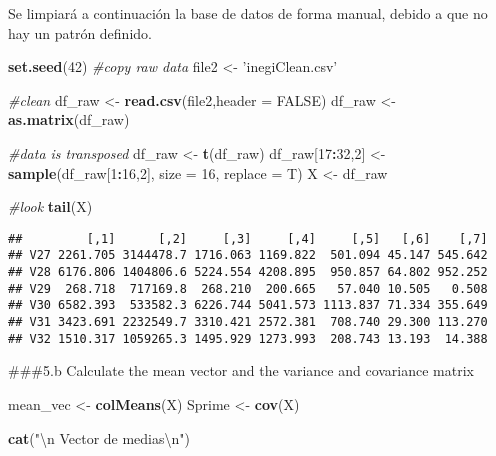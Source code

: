 \documentclass[]{article}
\newenvironment{Shaded}{\begin{snugshade}}{\end{snugshade}}
\newcommand{\CharTok}[1]{\textcolor[rgb]{0.31,0.60,0.02}{#1}}
\newcommand{\CommentTok}[1]{\textcolor[rgb]{0.56,0.35,0.01}{\textit{#1}}}
\newcommand{\DataTypeTok}[1]{\textcolor[rgb]{0.13,0.29,0.53}{#1}}
\newcommand{\DecValTok}[1]{\textcolor[rgb]{0.00,0.00,0.81}{#1}}
\newcommand{\KeywordTok}[1]{\textcolor[rgb]{0.13,0.29,0.53}{\textbf{#1}}}
\newcommand{\NormalTok}[1]{#1}
\newcommand{\OperatorTok}[1]{\textcolor[rgb]{0.81,0.36,0.00}{\textbf{#1}}}
\newcommand{\OtherTok}[1]{\textcolor[rgb]{0.56,0.35,0.01}{#1}}
\newcommand{\StringTok}[1]{\textcolor[rgb]{0.31,0.60,0.02}{#1}}
\begin{document}
Se limpiará a continuación la base de datos de forma manual, debido a
que no hay un patrón definido.

\begin{Shaded}
\begin{Highlighting}[]
\KeywordTok{set.seed}\NormalTok{(}\DecValTok{42}\NormalTok{)}
\CommentTok{#copy raw data}
\NormalTok{file2 <-}\StringTok{ 'inegiClean.csv'}

\CommentTok{#clean}
\NormalTok{df_raw <-}\StringTok{ }\KeywordTok{read.csv}\NormalTok{(file2,}\DataTypeTok{header =} \OtherTok{FALSE}\NormalTok{)}
\NormalTok{df_raw <-}\StringTok{ }\KeywordTok{as.matrix}\NormalTok{(df_raw)}

\CommentTok{#data is transposed}
\NormalTok{df_raw <-}\StringTok{ }\KeywordTok{t}\NormalTok{(df_raw)}
\NormalTok{df_raw[}\DecValTok{17}\OperatorTok{:}\DecValTok{32}\NormalTok{,}\DecValTok{2}\NormalTok{] <-}\StringTok{ }\KeywordTok{sample}\NormalTok{(df_raw[}\DecValTok{1}\OperatorTok{:}\DecValTok{16}\NormalTok{,}\DecValTok{2}\NormalTok{], }\DataTypeTok{size =} \DecValTok{16}\NormalTok{, }\DataTypeTok{replace =}\NormalTok{ T)}
\NormalTok{X <-}\StringTok{ }\NormalTok{df_raw}

\CommentTok{#look}
\KeywordTok{tail}\NormalTok{(X)}
\end{Highlighting}
\end{Shaded}

\begin{verbatim}
##         [,1]      [,2]     [,3]     [,4]     [,5]   [,6]    [,7]
## V27 2261.705 3144478.7 1716.063 1169.822  501.094 45.147 545.642
## V28 6176.806 1404806.6 5224.554 4208.895  950.857 64.802 952.252
## V29  268.718  717169.8  268.210  200.665   57.040 10.505   0.508
## V30 6582.393  533582.3 6226.744 5041.573 1113.837 71.334 355.649
## V31 3423.691 2232549.7 3310.421 2572.381  708.740 29.300 113.270
## V32 1510.317 1059265.3 1495.929 1273.993  208.743 13.193  14.388
\end{verbatim}

\#\#\#5.b Calculate the mean vector and the variance and covariance
matrix

\begin{Shaded}
\begin{Highlighting}[]
\NormalTok{mean_vec <-}\StringTok{ }\KeywordTok{colMeans}\NormalTok{(X)}
\NormalTok{Sprime <-}\StringTok{ }\KeywordTok{cov}\NormalTok{(X)}

\KeywordTok{cat}\NormalTok{(}\StringTok{"}\CharTok{\textbackslash{}n}\StringTok{ Vector de medias}\CharTok{\textbackslash{}n}\StringTok{"}\NormalTok{)}
\end{Highlighting}
\end{Shaded}
\end{document}
